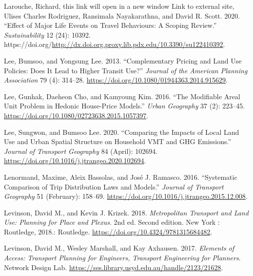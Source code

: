 \documentclass[
  11pt,
  openany]{memoir}
\newlength{\cslhangindent}
\newlength{\cslentryspacingunit} %
\newenvironment{CSLReferences}[2] %
 {%
  \setlength{\parindent}{0pt}
  \ifodd #1
  \let\oldpar\par
  \def\par{\hangindent=\cslhangindent\oldpar}
  \fi
  \setlength{\parskip}{#2\cslentryspacingunit}
 }%
 {}
\begin{document}
\begin{CSLReferences}{1}{0}
\leavevmode{}%
Larouche, Richard, this link will open in a new window Link to external site, Ulises Charles Rodriguez, Ransimala Nayakarathna, and David R. Scott. 2020. {``Effect of {Major Life Events} on {Travel Behaviours}: A {Scoping Review}.''} \emph{Sustainability} 12 (24): 10392. https://doi.org/\url{http://dx.doi.org.proxy.lib.pdx.edu/10.3390/su122410392}.

\leavevmode{}%
Lee, Bumsoo, and Yongsung Lee. 2013. {``Complementary {Pricing} and {Land Use Policies}: Does {It Lead} to {Higher Transit Use}?''} \emph{Journal of the American Planning Association} 79 (4): 314--28. \url{https://doi.org/10.1080/01944363.2014.915629}.

\leavevmode{}%
Lee, Gunhak, Daeheon Cho, and Kamyoung Kim. 2016. {``The Modifiable Areal Unit Problem in Hedonic House-Price Models.''} \emph{Urban Geography} 37 (2): 223--45. \url{https://doi.org/10.1080/02723638.2015.1057397}.

\leavevmode{}%
Lee, Sungwon, and Bumsoo Lee. 2020. {``Comparing the Impacts of Local Land Use and Urban Spatial Structure on Household {VMT} and {GHG} Emissions.''} \emph{Journal of Transport Geography} 84 (April): 102694. \url{https://doi.org/10.1016/j.jtrangeo.2020.102694}.

\leavevmode{}%
Lenormand, Maxime, Aleix Bassolas, and José J. Ramasco. 2016. {``Systematic Comparison of Trip Distribution Laws and Models.''} \emph{Journal of Transport Geography} 51 (February): 158--69. \url{https://doi.org/10.1016/j.jtrangeo.2015.12.008}.

\leavevmode{}%
Levinson, David M., and Kevin J. Krizek. 2018. \emph{Metropolitan {Transport} and {Land Use}: Planning for {Place} and {Plexus}}. 2nd ed. {Second edition. \textbar{} New York : Routledge, 2018.}: {Routledge}. \url{https://doi.org/10.4324/9781315684482}.

\leavevmode{}%
Levinson, David M., Wesley Marshall, and Kay Axhausen. 2017. \emph{Elements of {Access}: Transport {Planning} for {Engineers}, {Transport Engineering} for {Planners}}. {Network Design Lab}. \url{https://ses.library.usyd.edu.au/handle/2123/21628}.


\end{CSLReferences}
\end{document}
